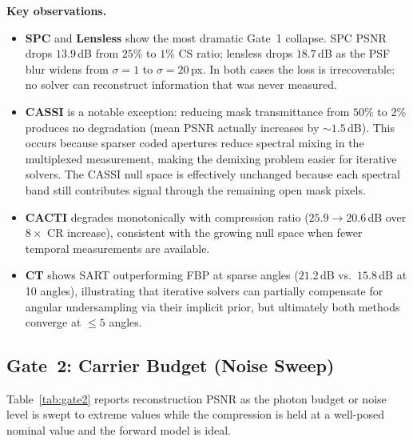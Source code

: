 \documentclass[11pt]{article}
\theoremstyle{definition}
\begin{document}
\noindent\textbf{Key observations.}
\begin{itemize}
  \item \textbf{SPC} and \textbf{Lensless} show the most dramatic Gate~1 collapse.
    SPC PSNR drops $13.9$\,dB from $25$\% to $1$\% CS ratio; lensless drops
    $18.7$\,dB as the PSF blur widens from $\sigma{=}1$ to $\sigma{=}20$\,px.
    In both cases the loss is irrecoverable: no solver can reconstruct
    information that was never measured.
  \item \textbf{CASSI} is a notable exception: reducing mask transmittance from
    $50$\% to $2$\% produces no degradation (mean PSNR actually increases by
    ${\sim}1.5$\,dB). This occurs because sparser coded apertures reduce
    spectral mixing in the multiplexed measurement, making the
    demixing problem easier for iterative solvers.  The CASSI null space
    is effectively unchanged because each spectral band still contributes
    signal through the remaining open mask pixels.
  \item \textbf{CACTI} degrades monotonically with compression ratio
    ($25.9 \to 20.6$\,dB over $8\times$ CR increase), consistent with the
    growing null space when fewer temporal measurements are available.
  \item \textbf{CT} shows SART outperforming FBP at sparse angles
    ($21.2$\,dB vs.\ $15.8$\,dB at 10 angles), illustrating that iterative
    solvers can partially compensate for angular undersampling via their
    implicit prior, but ultimately both methods converge at $\leq 5$ angles.
\end{itemize}


\subsection{Gate~2: Carrier Budget (Noise Sweep)}

Table~\ref{tab:gate2} reports reconstruction PSNR as the photon budget
or noise level is swept to extreme values while the compression is held
at a well-posed nominal value and the forward model is ideal.
\end{document}
